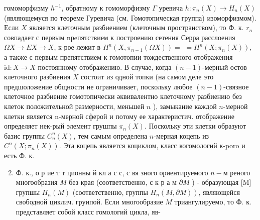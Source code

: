 \documentclass[10pt]{article}
\begin{document}
гомоморфизму $h^{-1}$, обратному к гомоморфизму $\Gamma$ уревича $h: \pi_{n}(X) \rightarrow H_{n}(X)$ (являющемуся по теореме Гуревича (см. Гомотопическая группа) изоморфизмом). Если $X$ является клеточным разбиением (клеточным пространством), то Ф. к. $r_{n}$ совпадает с первым nрeпятствием к построению сетения Серра расслоения $\Omega X \rightarrow E X \longrightarrow X$, к-рое лежит в $H^{n}\left(X, \pi_{n-1}(\Omega X)\right)=$ $=H^{n}\left(X ; \pi_{n}(X)\right)$, а также с первым препятствием к гомотопии тождественного отображения $\mathrm{id}: X \longrightarrow X$ постоянному отображению. В случае, когда $(n-1)$-мерный остов клеточного разбиения $X$ состоит из одной топки (на самом деле это предшоложение общности не ограничивает, поскольку любое $(n-1)$-связное клеточное разбиение гомотопически әквивалентно клеточному разбиению без клеток положительной размерности, меньшей $n$ ), замыкание каждой $n$-мерной клетки является n-мерной сферой и потому ее характеристич. отображение определяет нек-рый элемент грушпы $\pi_{n}(X)$. Поскольку эти клетки образуют базис группы $C_{n}^{n}(X)$, тем самым определена $n$-мерная коцепь из $C^{n}\left(X ; \pi_{n}(X)\right)$. Эта коцепь является коциклом, класс когомологий к-poro и есть Ф. к.



\begin{enumerate}

  \setcounter{enumi}{1}

  \item Ф. к., о р ие т т ционны й кл а с с, с вя зного ориентируемого $n-м$ реного многообразия $M$ без края (соответственно, с к р а м $\partial M$ ) - образующая [M] групшы $H_{n}(M)$ (соответственно, группы $\left.H_{n}(M, \partial M)\right)$, являющейся свободной циклич. груипой. Если многообразие $M$ триангулируемо, то Ф. к. представляет собой класс гомологий цикла, яв-

\end{enumerate}
\end{document}

